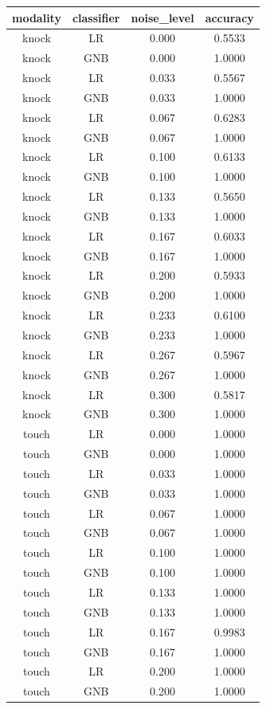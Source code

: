 \begin{table}[h]
\centering
\begin{tabular}{|c|c|c|c|}
\hline
modality & classifier & noise_level & accuracy \\ \hline
knock & LR & 0.000 & 0.5533 \\
knock & GNB & 0.000 & 1.0000 \\
knock & LR & 0.033 & 0.5567 \\
knock & GNB & 0.033 & 1.0000 \\
knock & LR & 0.067 & 0.6283 \\
knock & GNB & 0.067 & 1.0000 \\
knock & LR & 0.100 & 0.6133 \\
knock & GNB & 0.100 & 1.0000 \\
knock & LR & 0.133 & 0.5650 \\
knock & GNB & 0.133 & 1.0000 \\
knock & LR & 0.167 & 0.6033 \\
knock & GNB & 0.167 & 1.0000 \\
knock & LR & 0.200 & 0.5933 \\
knock & GNB & 0.200 & 1.0000 \\
knock & LR & 0.233 & 0.6100 \\
knock & GNB & 0.233 & 1.0000 \\
knock & LR & 0.267 & 0.5967 \\
knock & GNB & 0.267 & 1.0000 \\
knock & LR & 0.300 & 0.5817 \\
knock & GNB & 0.300 & 1.0000 \\
touch & LR & 0.000 & 1.0000 \\
touch & GNB & 0.000 & 1.0000 \\
touch & LR & 0.033 & 1.0000 \\
touch & GNB & 0.033 & 1.0000 \\
touch & LR & 0.067 & 1.0000 \\
touch & GNB & 0.067 & 1.0000 \\
touch & LR & 0.100 & 1.0000 \\
touch & GNB & 0.100 & 1.0000 \\
touch & LR & 0.133 & 1.0000 \\
touch & GNB & 0.133 & 1.0000 \\
touch & LR & 0.167 & 0.9983 \\
touch & GNB & 0.167 & 1.0000 \\
touch & LR & 0.200 & 1.0000 \\
touch & GNB & 0.200 & 1.0000 \\

\end{tabular}
\end{table}
